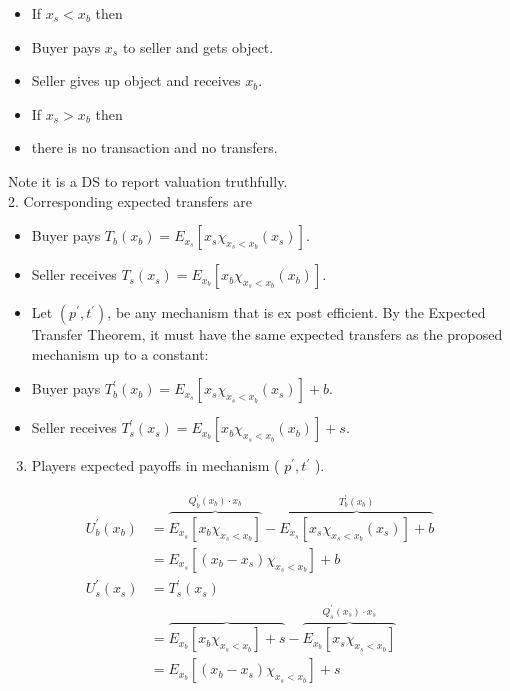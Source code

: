 \documentclass[10pt]{article}
\begin{document}
\begin{itemize}
  \item If $x_{s}<x_{b}$ then
  \item Buyer pays $x_{s}$ to seller and gets object.
  \item Seller gives up object and receives $x_{b}$.
  \item If $x_{s}>x_{b}$ then
  \item there is no transaction and no transfers.
\end{itemize}

Note it is a DS to report valuation truthfully.\\
2. Corresponding expected transfers are

\begin{itemize}
  \item Buyer pays $T_{b}\left(x_{b}\right)=E_{x_{s}}\left[x_{s} \chi_{x_{s}<x_{b}}\left(x_{s}\right)\right]$.
  \item Seller receives $T_{s}\left(x_{s}\right)=E_{x_{b}}\left[x_{b} \chi_{x_{s}<x_{b}}\left(x_{b}\right)\right]$.
  \item Let $\left(p^{\prime}, t^{\prime}\right)$, be any mechanism that is ex post efficient. By the Expected Transfer Theorem, it must have the same expected transfers as the proposed mechanism up to a constant:
  \item Buyer pays $T_{b}^{\prime}\left(x_{b}\right)=E_{x_{s}}\left[x_{s} \chi_{x_{s}<x_{b}}\left(x_{s}\right)\right]+b$.
  \item Seller receives $T_{s}^{\prime}\left(x_{s}\right)=E_{x_{b}}\left[x_{b} \chi_{x_{s}<x_{b}}\left(x_{b}\right)\right]+s$.
\end{itemize}

\begin{enumerate}
  \setcounter{enumi}{2}
  \item Players expected payoffs in mechanism ( $p^{\prime}, t^{\prime}$ ).
\end{enumerate}

$$
\begin{aligned}
U_{b}^{\prime}\left(x_{b}\right) & =\overbrace{E_{x_{s}}\left[x_{b} \chi_{x_{s}<x_{b}}\right]}^{Q_{b}^{\prime}\left(x_{b}\right) \cdot x_{b}}-\overbrace{E_{x_{s}}\left[x_{s} \chi_{x_{s}<x_{b}}\left(x_{s}\right)\right]+b}^{T_{b}^{\prime}\left(x_{b}\right)} \\
& =E_{x_{s}}\left[\left(x_{b}-x_{s}\right) \chi_{x_{s}<x_{b}}\right]+b \\
U_{s}^{\prime}\left(x_{s}\right) & =T_{s}^{\prime}\left(x_{s}\right) \\
& =\overbrace{E_{x_{b}}\left[x_{b} \chi_{x_{s}<x_{b}}\right]+s}-\overbrace{E_{x_{b}}\left[x_{s} \chi_{x_{s}<x_{b}}\right]}^{Q_{s}^{\prime}\left(x_{s}\right) \cdot x_{s}} \\
& =E_{x_{b}}\left[\left(x_{b}-x_{s}\right) \chi_{x_{s}<x_{b}}\right]+s
\end{aligned}
$$
\end{document}
